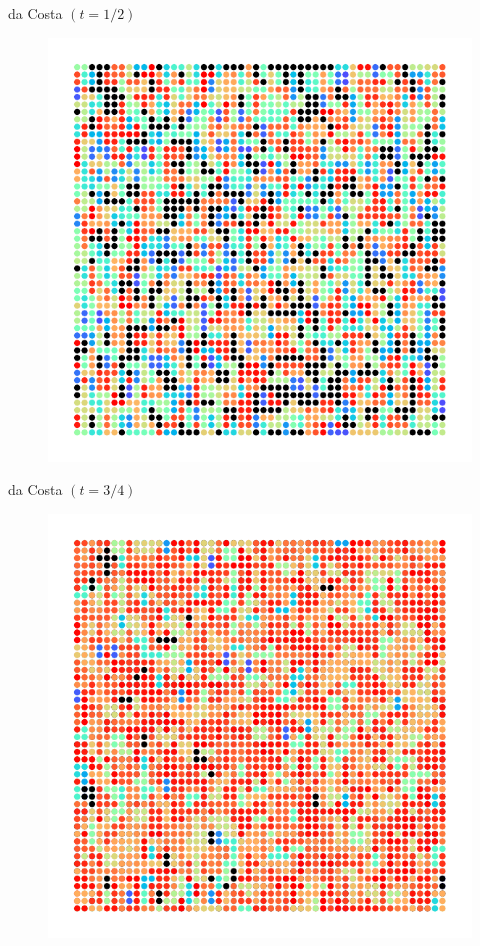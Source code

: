 \documentclass{beamer}
\begin{document}
\begin{frame}{da Costa $(t=1/2)$}
        \begin{figure}[H]
                \centering
                \includegraphics[scale=0.7]{fig/exp-precrit.pdf}
        \end{figure}
\end{frame}
\begin{frame}{da Costa $(t=3/4)$}
        \begin{figure}[H]
                \centering
                \includegraphics[scale=0.7]{fig/exp-crit.pdf}
        \end{figure}
\end{frame}
\end{document}
